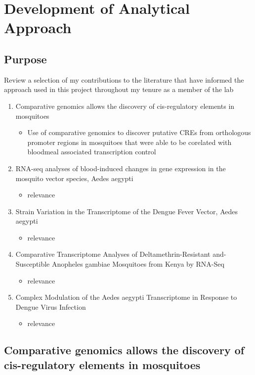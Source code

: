 \chapter{Development of Analytical Approach}

\section{Purpose}
Review a selection of my contributions to the literature that have informed the approach used in this project throughout my tenure as a member of the lab
\begin{enumerate}
 \item Comparative genomics allows the discovery of cis-regulatory elements in mosquitoes
  \begin{itemize}
   \item Use of comparative genomics to discover putative CREs from orthologous promoter regions in mosquitoes that were able to be corelated with bloodmeal associated transcription control
  \end{itemize}
 \item RNA-seq analyses of blood-induced changes in gene expression in the mosquito vector species, Aedes aegypti
  \begin{itemize}
   \item relevance
  \end{itemize}

 \item Strain Variation in the Transcriptome of the Dengue Fever Vector, Aedes aegypti
   \begin{itemize}
   \item relevance
  \end{itemize}
 \item Comparative Transcriptome Analyses of Deltamethrin-Resistant and-Susceptible Anopheles gambiae Mosquitoes from Kenya by RNA-Seq
   \begin{itemize}
   \item relevance
  \end{itemize}
 \item Complex Modulation of the Aedes aegypti Transcriptome in Response to Dengue Virus Infection
   \begin{itemize}
   \item relevance
  \end{itemize}
\end{enumerate}

\section{Comparative genomics allows the discovery of cis-regulatory elements in mosquitoes}


